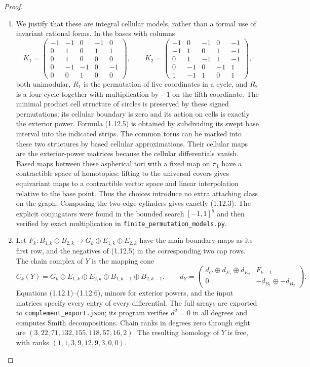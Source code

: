 \begin{proof}
\begin{enumerate}[label=\arabic*.]
\item We justify that these are integral cellular models, rather than a
formal use of invariant rational forms.  In the bases with columns
\[
K_1=\begin{pmatrix}
-1&-1&0&-1&0\\0&1&0&1&1\\0&1&0&0&0\\
0&-1&-1&0&-1\\0&0&1&0&0
\end{pmatrix},\qquad
K_2=\begin{pmatrix}
-1&0&-1&0&-1\\-1&1&0&1&-1\\0&1&-1&1&-1\\
0&-1&0&-1&1\\1&-1&1&0&1
\end{pmatrix},
\]
both unimodular, $R_1$ is the permutation of five coordinates in a
cycle, and $R_2$ is a four-cycle together with multiplication by $-1$
on the fifth coordinate.  The minimal product cell structure of
circles is preserved by these signed permutations; its cellular
boundary is zero and its action on cells is exactly the exterior
power.  Formula (1.12.5) is obtained by subdividing its swept
base interval into the indicated strips.  The common torus can be
marked into these two structures by based cellular approximations.
Their cellular maps are the exterior-power matrices because the
cellular differentials vanish.  Based maps between these aspherical
tori with a fixed map on $\pi_1$ have a contractible space of
homotopies: lifting to the universal covers gives equivariant maps
to a contractible vector space and linear interpolation relative to
the base point.  Thus the choices introduce no extra attaching class
on the graph.  Composing the two edge cylinders gives exactly
(1.12.3).  The explicit conjugators were found in the bounded search
$[-1,1]^5$ and then verified by exact multiplication in
\texttt{finite\_permutation\_models.py}.

\item Let $F_k:B_{1,k}\oplus B_{2,k}\to G_k\oplus E_{1,k}\oplus E_{2,k}$
have the main boundary maps as its first row, and the negatives of
(1.12.5) in the corresponding two cap rows.  The chain complex of
$Y$ is the mapping cone
\[
C_k(Y)=G_k\oplus E_{1,k}\oplus E_{2,k}
       \oplus B_{1,k-1}\oplus B_{2,k-1},\qquad
d_Y=\begin{pmatrix}d_G\oplus d_{E_1}\oplus d_{E_2}&F_{k-1}\\
0&-d_{B_1}\oplus-d_{B_2}\end{pmatrix}.
\tag{1.12.6}
\]
Equations (1.12.1)--(1.12.6), minors for exterior powers, and the input
matrices specify every entry of every differential.
The full arrays are exported to \texttt{complement\_export.json}; its
program verifies $d^2=0$ in all degrees and computes Smith
decompositions.  Chain ranks in degrees zero through eight are
$(3,22,71,132,155,118,57,16,2)$.
The resulting homology of $Y$ is free, with ranks
$(1,1,3,9,12,9,3,0,0)$.


\end{enumerate}
\end{proof}

